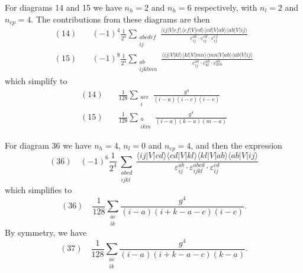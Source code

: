 For diagrams 14 and 15 we have $n_h = 2$ and $n_h = 6$ respectively, with $n_l = 2$ and $n_{ep} = 4$.
The contributions from these diagrams are then
\begin{align*}
    (14) \quad& (-1)^4 \frac{1}{2^4} \sum_{\substack{abcdef \\ ij}} \frac{
        \langle ij \vert V \vert ef \rangle
        \langle ef \vert V \vert cd \rangle
        \langle cd \vert V \vert ab \rangle
        \langle ab \vert V \vert ij \rangle
    }{
        \varepsilon_{ij}^{ab} \cdot
        \varepsilon_{ij}^{cd} \cdot
        \varepsilon_{ij}^{ef}
    } \\
    (15) \quad& (-1)^8 \frac{1}{2^4} \sum_{\substack{ab \\ ijklmn}} \frac{
        \langle ij \vert V \vert kl \rangle
        \langle kl \vert V \vert mn \rangle
        \langle mn \vert V \vert ab \rangle
        \langle ab \vert V \vert ij \rangle
    }{
        \varepsilon_{ij}^{ab} \cdot
        \varepsilon_{kl}^{ab} \cdot
        \varepsilon_{mn}^{ab}
    }
\end{align*}
which simplify to
\begin{align*}
    (14) \quad& \frac{1}{128} \sum_{\substack{ace\\i}} \frac{
        g^4
    }{
        (i - a)(i - c)(i - e)
    } \\
    (15) \quad& \frac{1}{128} \sum_{\substack{a\\ikm}} \frac{
        g^4
    }{
        (i - a)(k - a)(m - a)
    }
\end{align*}

For diagram 36 we have $n_h = 4$, $n_l = 0$ and $n_{ep} = 4$, and then the expression
\begin{equation*}
    (36) \quad (-1)^6 \frac{1}{2^4} \sum_{\substack{abcd \\ ijkl}} \frac{
        \langle ij \vert V \vert cd \rangle
        \langle cd \vert V \vert kl \rangle
        \langle kl \vert V \vert ab \rangle
        \langle ab \vert V \vert ij \rangle
    }{
        \varepsilon_{ij}^{ab} \cdot
        \varepsilon_{ijkl}^{abcd} \cdot
        \varepsilon_{ij}^{cd}
    }
\end{equation*}
which simplifies to
\begin{equation*}
    (36) \quad \frac{1}{128} \sum_{\substack{ac\\ik}} \frac{
        g^4
    }{
        (i - a)(i + k - a - c)(i - c)
    }.
\end{equation*}
By symmetry, we have
\begin{equation*}
    (37) \quad \frac{1}{128} \sum_{\substack{ac\\ik}} \frac{
        g^4
    }{
        (i - a)(i + k - a - c)(k - a)
    }.
\end{equation*}

